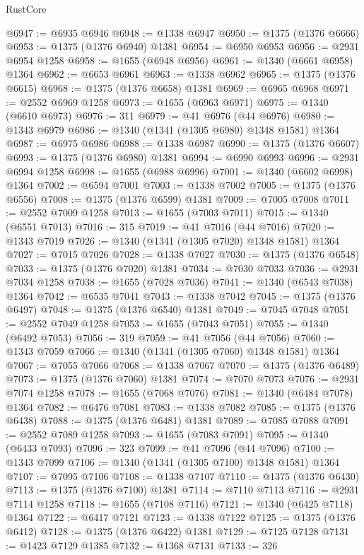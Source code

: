 \begin{lexlean}{RustCore}
\begin{coremodule}
@6947 := @6935 @6946
@6948 := @1338 @6947
@6950 := @1375 (@1376 @6666)
@6953 := @1375 (@1376 @6940) @1381
@6954 := @6950 @6953
@6956 := @2931 @6954 @1258
@6958 := @1655 (@6948 @6956)
@6961 := @1340 (@6661 @6958) @1364
@6962 := @6653 @6961
@6963 := @1338 @6962
@6965 := @1375 (@1376 @6615)
@6968 := @1375 (@1376 @6658) @1381
@6969 := @6965 @6968
@6971 := @2552 @6969 @1258
@6973 := @1655 (@6963 @6971)
@6975 := @1340 (@6610 @6973)
@6976 := 311
@6979 := @41 @6976 (@44 @6976)
@6980 := @1343 @6979
@6986 := @1340 (@1341 (@1305 @6980) @1348 @1581) @1364
@6987 := @6975 @6986
@6988 := @1338 @6987
@6990 := @1375 (@1376 @6607)
@6993 := @1375 (@1376 @6980) @1381
@6994 := @6990 @6993
@6996 := @2931 @6994 @1258
@6998 := @1655 (@6988 @6996)
@7001 := @1340 (@6602 @6998) @1364
@7002 := @6594 @7001
@7003 := @1338 @7002
@7005 := @1375 (@1376 @6556)
@7008 := @1375 (@1376 @6599) @1381
@7009 := @7005 @7008
@7011 := @2552 @7009 @1258
@7013 := @1655 (@7003 @7011)
@7015 := @1340 (@6551 @7013)
@7016 := 315
@7019 := @41 @7016 (@44 @7016)
@7020 := @1343 @7019
@7026 := @1340 (@1341 (@1305 @7020) @1348 @1581) @1364
@7027 := @7015 @7026
@7028 := @1338 @7027
@7030 := @1375 (@1376 @6548)
@7033 := @1375 (@1376 @7020) @1381
@7034 := @7030 @7033
@7036 := @2931 @7034 @1258
@7038 := @1655 (@7028 @7036)
@7041 := @1340 (@6543 @7038) @1364
@7042 := @6535 @7041
@7043 := @1338 @7042
@7045 := @1375 (@1376 @6497)
@7048 := @1375 (@1376 @6540) @1381
@7049 := @7045 @7048
@7051 := @2552 @7049 @1258
@7053 := @1655 (@7043 @7051)
@7055 := @1340 (@6492 @7053)
@7056 := 319
@7059 := @41 @7056 (@44 @7056)
@7060 := @1343 @7059
@7066 := @1340 (@1341 (@1305 @7060) @1348 @1581) @1364
@7067 := @7055 @7066
@7068 := @1338 @7067
@7070 := @1375 (@1376 @6489)
@7073 := @1375 (@1376 @7060) @1381
@7074 := @7070 @7073
@7076 := @2931 @7074 @1258
@7078 := @1655 (@7068 @7076)
@7081 := @1340 (@6484 @7078) @1364
@7082 := @6476 @7081
@7083 := @1338 @7082
@7085 := @1375 (@1376 @6438)
@7088 := @1375 (@1376 @6481) @1381
@7089 := @7085 @7088
@7091 := @2552 @7089 @1258
@7093 := @1655 (@7083 @7091)
@7095 := @1340 (@6433 @7093)
@7096 := 323
@7099 := @41 @7096 (@44 @7096)
@7100 := @1343 @7099
@7106 := @1340 (@1341 (@1305 @7100) @1348 @1581) @1364
@7107 := @7095 @7106
@7108 := @1338 @7107
@7110 := @1375 (@1376 @6430)
@7113 := @1375 (@1376 @7100) @1381
@7114 := @7110 @7113
@7116 := @2931 @7114 @1258
@7118 := @1655 (@7108 @7116)
@7121 := @1340 (@6425 @7118) @1364
@7122 := @6417 @7121
@7123 := @1338 @7122
@7125 := @1375 (@1376 @6412)
@7128 := @1375 (@1376 @6422) @1381
@7129 := @7125 @7128
@7131 := @1423 @7129 @1385
@7132 := @1368 @7131
@7133 := 326

\end{coremodule}
\end{lexlean}
